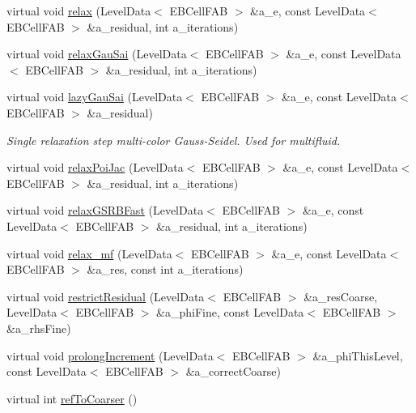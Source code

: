 \begin{DoxyCompactItemize}
\item 
virtual void \hyperlink{classebconductivityop_ad0db9547e5e4d6852e20f6939151edde}{relax} (Level\+Data$<$ E\+B\+Cell\+F\+AB $>$ \&a\+\_\+e, const Level\+Data$<$ E\+B\+Cell\+F\+AB $>$ \&a\+\_\+residual, int a\+\_\+iterations)
\item 
virtual void \hyperlink{classebconductivityop_a7abe6f8e6348438bb6dc6cf033a84f99}{relax\+Gau\+Sai} (Level\+Data$<$ E\+B\+Cell\+F\+AB $>$ \&a\+\_\+e, const Level\+Data$<$ E\+B\+Cell\+F\+AB $>$ \&a\+\_\+residual, int a\+\_\+iterations)
\item 
virtual void \hyperlink{classebconductivityop_a1757ea5a9f0f88f4ba7ccc21ffbfa23a}{lazy\+Gau\+Sai} (Level\+Data$<$ E\+B\+Cell\+F\+AB $>$ \&a\+\_\+e, const Level\+Data$<$ E\+B\+Cell\+F\+AB $>$ \&a\+\_\+residual)
\begin{DoxyCompactList}\small\item\em Single relaxation step multi-\/color Gauss-\/\+Seidel. Used for multifluid. \end{DoxyCompactList}\item 
virtual void \hyperlink{classebconductivityop_ad38be94a8b65e9ddca7bf515dd4ae502}{relax\+Poi\+Jac} (Level\+Data$<$ E\+B\+Cell\+F\+AB $>$ \&a\+\_\+e, const Level\+Data$<$ E\+B\+Cell\+F\+AB $>$ \&a\+\_\+residual, int a\+\_\+iterations)
\item 
virtual void \hyperlink{classebconductivityop_a65934a6af8c246d7afff86167bb112b7}{relax\+G\+S\+R\+B\+Fast} (Level\+Data$<$ E\+B\+Cell\+F\+AB $>$ \&a\+\_\+e, const Level\+Data$<$ E\+B\+Cell\+F\+AB $>$ \&a\+\_\+residual, int a\+\_\+iterations)
\item 
virtual void \hyperlink{classebconductivityop_a1e2e2cbaafc86f00fcac06b650d0083b}{relax\+\_\+mf} (Level\+Data$<$ E\+B\+Cell\+F\+AB $>$ \&a\+\_\+e, const Level\+Data$<$ E\+B\+Cell\+F\+AB $>$ \&a\+\_\+res, const int a\+\_\+iterations)
\item 
virtual void \hyperlink{classebconductivityop_ad9d1997303d2a9a17525f62649a4a4d1}{restrict\+Residual} (Level\+Data$<$ E\+B\+Cell\+F\+AB $>$ \&a\+\_\+res\+Coarse, Level\+Data$<$ E\+B\+Cell\+F\+AB $>$ \&a\+\_\+phi\+Fine, const Level\+Data$<$ E\+B\+Cell\+F\+AB $>$ \&a\+\_\+rhs\+Fine)
\item 
virtual void \hyperlink{classebconductivityop_a8d365349b07c20adaf3562755bd67783}{prolong\+Increment} (Level\+Data$<$ E\+B\+Cell\+F\+AB $>$ \&a\+\_\+phi\+This\+Level, const Level\+Data$<$ E\+B\+Cell\+F\+AB $>$ \&a\+\_\+correct\+Coarse)
\item 
virtual int \hyperlink{classebconductivityop_aacb5b02331fd1ce56ea67415f8b7abb7}{ref\+To\+Coarser} ()

\end{DoxyCompactItemize}
